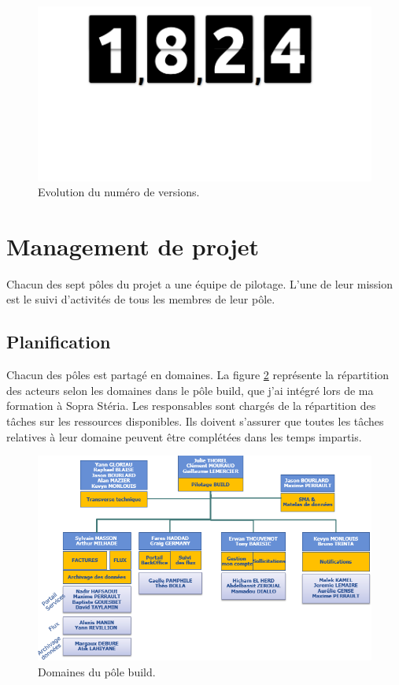\documentclass[12pt,a4paper]{article}
\begin{document}
\begin{figure}[!hp]
		\begin{center}
			\includegraphics[width=\textwidth,keepaspectratio]{versions.png}
			\caption{Evolution du numéro de versions.}
			\label{versions}
		\end{center}
\end{figure}
\medbreak
\clearpage
\newpage
\section{Management de projet}
Chacun des sept pôles du projet a une équipe de pilotage. L'une de leur mission est le suivi d'activités de tous les membres de leur pôle. 
\subsection{Planification}
Chacun des pôles est partagé en domaines. La figure \ref{domaines} représente la répartition des acteurs selon les domaines dans le pôle build, que j'ai intégré lors de ma formation à Sopra Stéria. Les responsables sont chargés de la répartition des tâches sur les ressources disponibles. Ils doivent s'assurer que toutes les tâches relatives à leur domaine peuvent être complétées dans les temps impartis.
\begin{figure}[H]
	\begin{center}
		\includegraphics[width=\textwidth,height=\textheight,keepaspectratio]{domaines.png}
		\caption{Domaines du pôle build.}
		\label{domaines}
	\end{center}
\end{figure}
\end{document}
